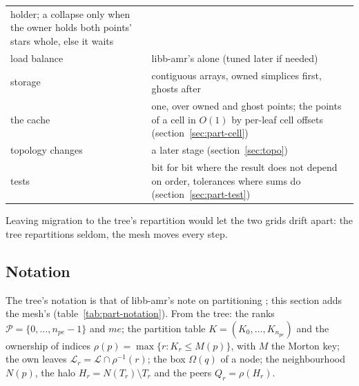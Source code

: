 \documentclass[10pt,a4paper]{article}
\theoremstyle{definition}
\begin{document}
\begin{center}
\begin{tabularx}{\textwidth}{@{}>{\raggedright}p{}X@{}}
    holder; a collapse only when the owner holds both points' stars whole,
    else it waits \\
  load balance & libb-amr's alone (tuned later if needed) \\
  storage & contiguous arrays, owned simplices first, ghosts after \\
  the cache & one, over owned and ghost points; the points of a cell in
    $O(1)$ by per-leaf cell offsets (section~\ref{sec:part-cell}) \\
  topology changes & a later stage (section~\ref{sec:topo}) \\
  tests & bit for bit where the result does not depend on order,
    tolerances where sums do (section~\ref{sec:part-test}) \\
  \bottomrule
\end{tabularx}
\end{center}

Leaving migration to the tree's repartition would let the two grids drift
apart: the tree repartitions seldom, the mesh moves every step.

\subsection{Notation}
\label{sec:part-notation}

The tree's notation is that of libb-amr's note on partitioning
\cite{bamrpart}; this section adds the mesh's (table~\ref{tab:part-notation}).
From the tree: the ranks $\mathcal{P} = \{0, \ldots, n_{pe} - 1\}$ and
$me$; the partition table $K = (K_0, \ldots, K_{n_{pe}})$ and the ownership
of indices $\rho(p) = \max\{ r : K_r \le M(p) \}$, with $M$ the Morton key;
the own leaves $\mathcal{L}_r = \mathcal{L} \cap \rho^{-1}(r)$; the box
$\Omega(q)$ of a node; the neighbourhood $N(p)$, the halo $H_r = N(T_r)
\setminus T_r$ and the peers $Q_r = \rho(H_r)$.
\end{document}
